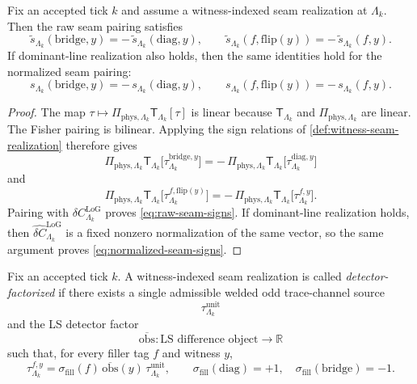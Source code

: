 \documentclass[11pt]{article}
\begin{document}
\begin{proposition}
\label{prop:seam-scalar-signs}
Fix an accepted tick \(k\) and assume a witness-indexed seam realization at \(\Lambda_k\).
Then the raw seam pairing satisfies
\begin{equation}
\widetilde s_{\Lambda_k}(\mathrm{bridge},y)
=
-\,\widetilde s_{\Lambda_k}(\mathrm{diag},y),
\qquad
\widetilde s_{\Lambda_k}(f,\mathrm{flip}(y))
=
-\,\widetilde s_{\Lambda_k}(f,y).
\label{eq:raw-seam-signs}
\end{equation}
If dominant-line realization also holds, then the same identities hold for the normalized seam
pairing:
\begin{equation}
s_{\Lambda_k}(\mathrm{bridge},y)
=
-\,s_{\Lambda_k}(\mathrm{diag},y),
\qquad
s_{\Lambda_k}(f,\mathrm{flip}(y))
=
-\,s_{\Lambda_k}(f,y).
\label{eq:normalized-seam-signs}
\end{equation}
\end{proposition}

\begin{proof}
The map
\(
\tau\mapsto \Pi_{\mathrm{phys},\Lambda_k}\mathsf T_{\Lambda_k}[\tau]
\)
is linear because \(\mathsf T_{\Lambda_k}\) and \(\Pi_{\mathrm{phys},\Lambda_k}\) are linear.
The Fisher pairing is bilinear.
Applying the sign relations of \cref{def:witness-seam-realization} therefore gives
\[
\Pi_{\mathrm{phys},\Lambda_k}\mathsf T_{\Lambda_k}\!\big[\tau^{\mathrm{bridge},y}_{\Lambda_k}\big]
=
-\,\Pi_{\mathrm{phys},\Lambda_k}\mathsf T_{\Lambda_k}\!\big[\tau^{\mathrm{diag},y}_{\Lambda_k}\big]
\]
and
\[
\Pi_{\mathrm{phys},\Lambda_k}\mathsf T_{\Lambda_k}\!\big[\tau^{f,\mathrm{flip}(y)}_{\Lambda_k}\big]
=
-\,\Pi_{\mathrm{phys},\Lambda_k}\mathsf T_{\Lambda_k}\!\big[\tau^{f,y}_{\Lambda_k}\big].
\]
Pairing with \(\delta C^{\mathrm{LoG}}_{\Lambda_k}\) proves \eqref{eq:raw-seam-signs}.
If dominant-line realization holds, then
\(
\widehat{\delta C}^{\mathrm{LoG}}_{\Lambda_k}
\)
is a fixed nonzero normalization of the same vector, so the same argument proves
\eqref{eq:normalized-seam-signs}.
\end{proof}

\begin{definition}
\label{def:detector-factorized-seam}
Fix an accepted tick \(k\).
A witness-indexed seam realization is called \emph{detector-factorized} if there exists a single
admissible welded odd trace-channel source
\[
\tau^{\mathrm{unit}}_{\Lambda_k}
\]
and the LS detector factor
\[
\overline{\mathrm{obs}}
:
\text{LS difference object}\to\mathbb R
\]
such that, for every filler tag \(f\) and witness \(y\),
\begin{equation}
\tau^{f,y}_{\Lambda_k}
=
\sigma_{\mathrm{fill}}(f)\,
\overline{\mathrm{obs}}(y)\,
\tau^{\mathrm{unit}}_{\Lambda_k},
\qquad
\sigma_{\mathrm{fill}}(\mathrm{diag})=+1,\quad
\sigma_{\mathrm{fill}}(\mathrm{bridge})=-1.
\label{eq:detector-factorized-seam}
\end{equation}
\end{definition}
\end{document}
